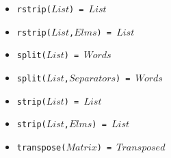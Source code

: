 \documentclass[10pt]{article}
\newcommand{\ignore}[1]{}
\begin{document}
\begin{multicols}{2}
\begin{scriptsize}
\begin{itemize}
    \item \texttt{rstrip($List$) = $List$ } 
    \item \texttt{rstrip($List$,$Elms$) = $List$ } 
    \item \texttt{split($List$) = $Words$ } 
    \item \texttt{split($List$,$Separators$) = $Words$ } 
    \item \texttt{strip($List$) = $List$ } 
    \item \texttt{strip($List$,$Elms$) = $List$ } 
    \item \texttt{transpose($Matrix$) = $Transposed$} 
\end{itemize}
\end{scriptsize}


\ignore{
}
\end{multicols}
\end{document}
